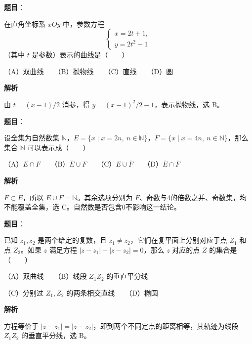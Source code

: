 \begin{answer}

\textbf{题目}：

在直角坐标系 $xOy$ 中，参数方程
\nopagebreak[4]
\[
\begin{cases}
x=2t+1,\\
y=2t^2-1
\end{cases}
\]
（其中 $t$ 是参数）表示的曲线是\mbox{（　　）}

（A）双曲线　　（B）抛物线　　（C）直线　　（D）圆

\textbf{解析}

由 $t=(x-1)/2$ 消参，得 $y=(x-1)^2/2-1$，表示抛物线，选 B。


\end{answer}
\begin{answer}

\textbf{题目}：

设全集为自然数集 $\mathbb N$，$E=\{x\mid x=2n,\ n\in\mathbb N\}$，$F=\{x\mid x=4n,\ n\in\mathbb N\}$，那么集合 $\mathbb N$ 可以表示成\mbox{（　　）}

（A）$E\cap F$　　（B）$\overline E\cup F$　　（C）$E\cup\overline F$　　（D）$\overline E\cap\overline F$

\textbf{解析}

$F\subset E$，所以 $E\cup\overline F=\mathbb N$。其余选项分别为 $F$、奇数与4的倍数之并、奇数集，均不能覆盖全集，选 C。自然数是否包含0不影响这一结论。


\end{answer}
\begin{answer}

\textbf{题目}：

已知 $z_1,z_2$ 是两个给定的复数，且 $z_1\ne z_2$，它们在复平面上分别对应于点 $Z_1$ 和点 $Z_2$。如果 $z$ 满足方程 $|z-z_1|-|z-z_2|=0$，那么 $z$ 对应的点 $Z$ 的集合是\mbox{（　　）}

（A）双曲线　　（B）线段 $Z_1Z_2$ 的垂直平分线

（C）分别过 $Z_1,Z_2$ 的两条相交直线　　（D）椭圆

\textbf{解析}

方程等价于 $|z-z_1|=|z-z_2|$，即到两个不同定点的距离相等，其轨迹为线段 $Z_1Z_2$ 的垂直平分线，选 B。


\end{answer}
